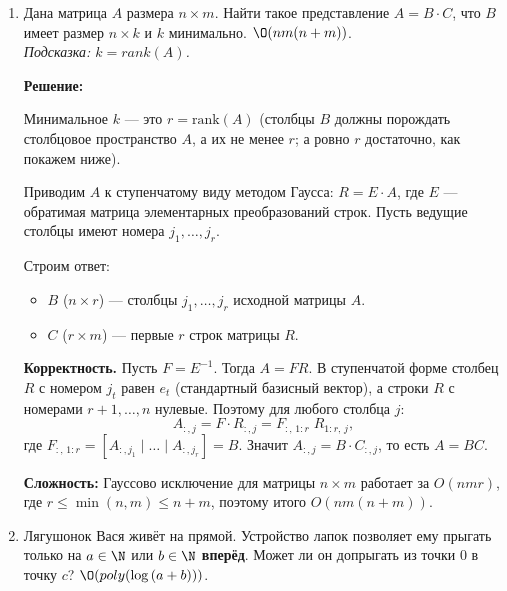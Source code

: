 \begin{enumerate}
\begin{enumerate}
      \item \textbf{Сложность}: на каждой итерации пункта (c) суммарный битовый размер $u + v$ уменьшается хотя бы на 1 (деление на 2),
      а пункт (d) не увеличивает $\max(u,v)$.
      Поэтому всего $O(n)$ итераций, где $n$ --- битовая длина входа.
      Каждая операция с длинными числами~--- $O(n)$, итого $O(n^2)$.

    \end{enumerate}

  \item
    Дана матрица $A$ размера $n \times m$. Найти такое представление $A = B \cdot C$, что
    $B$ имеет размер $n \times k$ и $k$ минимально. $\O(n m (n + m))$. \\
    \textit{Подсказка: $k=rank(A)$.}

    \textbf{Решение:}

    Минимальное $k$ --- это $r = \mathrm{rank}(A)$
    (столбцы $B$ должны порождать столбцовое пространство $A$, а их не менее $r$;
    а ровно $r$ достаточно, как покажем ниже).

    Приводим $A$ к ступенчатому виду методом Гаусса:
    $R = E \cdot A$, где $E$ --- обратимая матрица элементарных преобразований строк.
    Пусть ведущие столбцы имеют номера $j_1, \ldots, j_r$.

    Строим ответ:
    \begin{itemize}
      \item $B$ ($n \times r$) --- столбцы $j_1, \ldots, j_r$ исходной матрицы $A$.
      \item $C$ ($r \times m$) --- первые $r$ строк матрицы $R$.
    \end{itemize}

    \textbf{Корректность.}
    Пусть $F = E^{-1}$. Тогда $A = F R$.
    В ступенчатой форме столбец $R$ с номером $j_t$ равен $e_t$ (стандартный базисный вектор),
    а строки $R$ с номерами $r{+}1, \ldots, n$ нулевые.
    Поэтому для любого столбца $j$:
    $$A_{:,j} = F \cdot R_{:,j} = F_{:,\,1:r}\; R_{1:r,\,j},$$
    где $F_{:,\,1:r} = [A_{:,j_1} \mid \ldots \mid A_{:,j_r}] = B$.
    Значит $A_{:,j} = B \cdot C_{:,j}$, то есть $A = BC$.

    \textbf{Сложность:}
    Гауссово исключение для матрицы $n \times m$ работает за $O(nmr)$,
    где $r \le \min(n,m) \le n + m$, поэтому итого $O(nm(n+m))$.

  \item
    Лягушонок Вася живёт на прямой. Устройство лапок позволяет ему прыгать только
    на $a \in \N$ или $b \in \N$ \textbf{вперёд}.
    Может ли он допрыгать из точки $0$ в точку $c$? $\O(poly(\log{(a+b})))$.


\end{enumerate}
